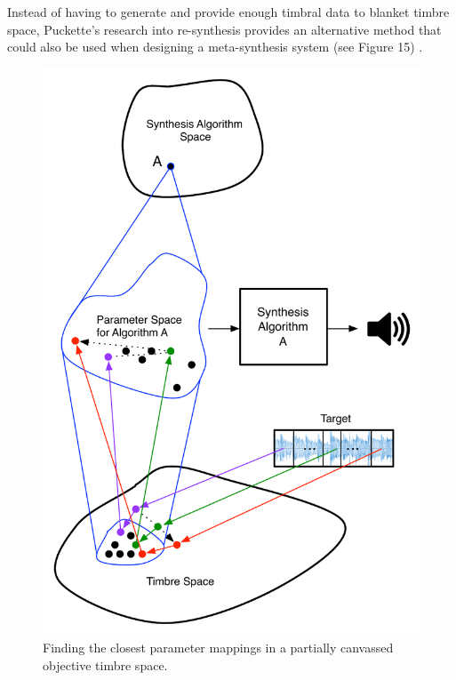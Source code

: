 \documentclass[12pt]{report} 	%
\numberwithin{figure}{chapter}
\numberwithin{table}{chapter}
\numberwithin{equation}{chapter}
\begin{document}
\begin{flushleft}
Instead of having to generate and provide enough timbral data to blanket timbre space, Puckette's research into re-synthesis provides an alternative method that could also be used when designing a meta-synthesis system (see Figure 15) \cite{Puckette:2004zp}.
\begin{figure}[h!]
\begin{center}
\includegraphics[scale=0.75]{PucketteMetaSynthesis}
\caption[Mapping timbre to parameters]{Finding the closest parameter mappings in a partially canvassed objective timbre space.}
\end{center}
\end{figure}


\end{flushleft}
\end{document}
